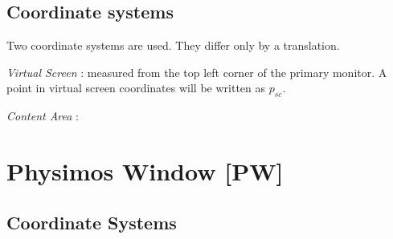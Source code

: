 \documentclass[12pt]{article}
\begin{document}
\subsection{Coordinate systems}

Two coordinate systems are used. They differ only by a translation. 

\textit{Virtual Screen} : measured from the top left corner of the primary monitor. A point in virtual screen coordinates will be written as $p_{sc}$.

\textit{Content Area} : 




\section{Physimos Window [PW]}

\subsection{Coordinate Systems}
\end{document}
